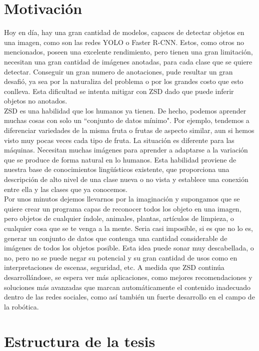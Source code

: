 \section{Motivación} \label{sec:motivacion}

Hoy en día, hay una gran cantidad de modelos, capaces de detectar objetos en una imagen, como son las redes YOLO o Faster R-CNN. Estos, como otros no mencionados, poseen una excelente rendimiento, pero tienen una gran limitación, necesitan una gran cantidad de imágenes anotadas, para cada clase que se quiere detectar. Conseguir un gran numero de anotaciones, pude resultar un gran desafió, ya sea por la naturaliza del problema o por los grandes costo que esto conlleva. Esta dificultad se intenta mitigar con ZSD dado que puede inferir objetos no anotados.\\ 

ZSD es una habilidad que los humanos ya tienen. De hecho, podemos aprender muchas cosas con solo un ``conjunto de datos mínimo". Por ejemplo, tendemos a diferenciar  variedades de la misma fruta o frutas de aspecto similar, aun si hemos visto muy pocas veces cada tipo de fruta. La situación es diferente para las máquinas. Necesitan muchas imágenes para aprender a adaptarse a la variación que se produce de forma natural en lo humanos. Esta habilidad proviene de nuestra base de conocimientos lingüísticos existente, que proporciona una descripción de alto nivel de una clase nueva o no vista y establece una conexión entre ella y las clases que ya conocemos.\\

Por unos minutos dejemos llevarnos por la imaginación y supongamos que se quiere crear un programa capas de reconocer todos los objeto en una imagen, pero objetos de cualquier índole, animales, plantas, artículos de limpieza, o cualquier cosa que se te venga a la mente. Seria casi imposible, si es que no lo es, generar un conjunto de datos que contenga una cantidad considerable de imágenes de todos los objetos posible. Esta idea puede sonar muy descabellada, o no, pero no se puede negar su potencial y su gran cantidad de usos como en interpretaciones de escenas, seguridad, etc. A medida que ZSD continúa desarrollándose, se espera ver más aplicaciones, como mejores recomendaciones y soluciones más avanzadas que marcan automáticamente el contenido inadecuado dentro de las redes sociales, como así también un fuerte desarrollo en el campo de la robótica.

\section{Estructura de la tesis} \label{sec:estructuradelatesis}

